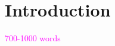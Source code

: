 \documentclass[pdflatex,sn-mathphys-num]{sn-jnl}%
\theoremstyle{thmstyleone}%
\theoremstyle{thmstyletwo}%
\theoremstyle{thmstylethree}%
\newcommand{\danique}[1]{\textcolor{magenta}{#1}}
\begin{document}
\section*{Introduction}
\danique{700-1000 words}\\
\end{document}
